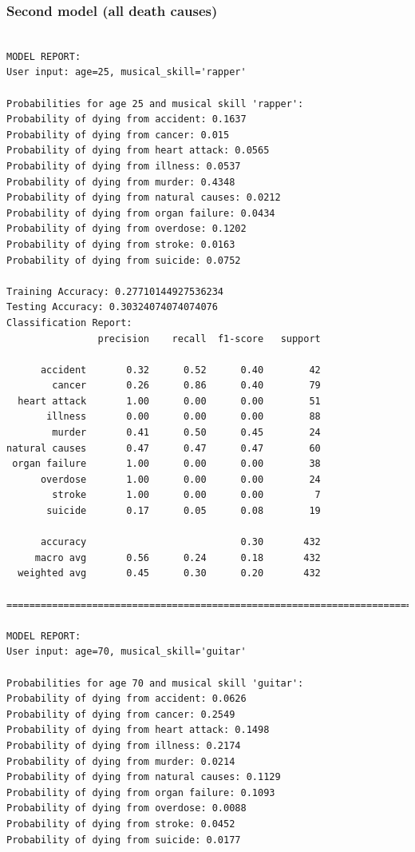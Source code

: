 \documentclass{article}
\begin{document}
\clearpage
\subsubsection{Second model (all death causes)}


\begin{verbatim}

MODEL REPORT:
User input: age=25, musical_skill='rapper'

Probabilities for age 25 and musical skill 'rapper':
Probability of dying from accident: 0.1637
Probability of dying from cancer: 0.015
Probability of dying from heart attack: 0.0565
Probability of dying from illness: 0.0537
Probability of dying from murder: 0.4348
Probability of dying from natural causes: 0.0212
Probability of dying from organ failure: 0.0434
Probability of dying from overdose: 0.1202
Probability of dying from stroke: 0.0163
Probability of dying from suicide: 0.0752

Training Accuracy: 0.27710144927536234
Testing Accuracy: 0.30324074074074076
Classification Report:
                precision    recall  f1-score   support

      accident       0.32      0.52      0.40        42
        cancer       0.26      0.86      0.40        79
  heart attack       1.00      0.00      0.00        51
       illness       0.00      0.00      0.00        88
        murder       0.41      0.50      0.45        24
natural causes       0.47      0.47      0.47        60
 organ failure       1.00      0.00      0.00        38
      overdose       1.00      0.00      0.00        24
        stroke       1.00      0.00      0.00         7
       suicide       0.17      0.05      0.08        19

      accuracy                           0.30       432
     macro avg       0.56      0.24      0.18       432
  weighted avg       0.45      0.30      0.20       432

==============================================================================

MODEL REPORT:
User input: age=70, musical_skill='guitar'

Probabilities for age 70 and musical skill 'guitar':
Probability of dying from accident: 0.0626
Probability of dying from cancer: 0.2549
Probability of dying from heart attack: 0.1498
Probability of dying from illness: 0.2174
Probability of dying from murder: 0.0214
Probability of dying from natural causes: 0.1129
Probability of dying from organ failure: 0.1093
Probability of dying from overdose: 0.0088
Probability of dying from stroke: 0.0452
Probability of dying from suicide: 0.0177


\end{verbatim}
\end{document}
